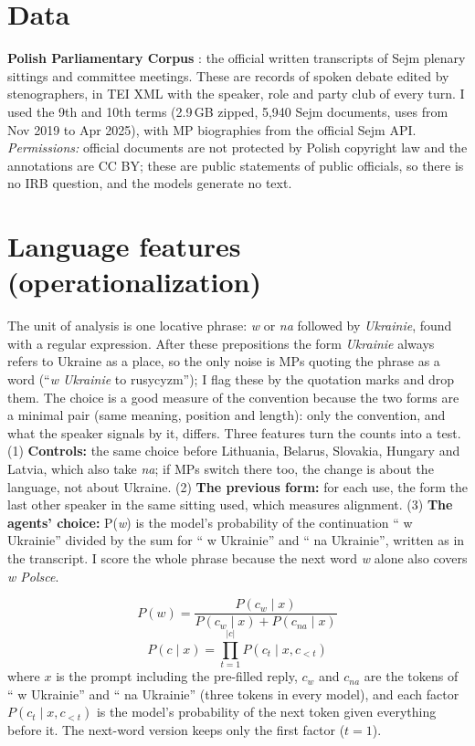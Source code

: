 \documentclass[10pt,twocolumn]{article}
\begin{document}
\section{Data}
\textbf{Polish Parliamentary Corpus} \citep[PPC;][]{ogrodniczuk2018}: the official written transcripts of Sejm plenary sittings and committee meetings. These are records of spoken debate edited by stenographers, in TEI XML with the speaker, role and party club of every turn. I used the 9th and 10th terms (2.9\,GB zipped, 5,940 Sejm documents, uses from Nov 2019 to Apr 2025), with MP biographies from the official Sejm API. \emph{Permissions:} official documents are not protected by Polish copyright law and the annotations are CC BY; these are public statements of public officials, so there is no IRB question, and the models generate no text.

\section{Language features (operationalization)}
The unit of analysis is one locative phrase: \emph{w} or \emph{na} followed by \emph{Ukrainie}, found with a regular expression. After these prepositions the form \emph{Ukrainie} always refers to Ukraine as a place, so the only noise is MPs quoting the phrase as a word (``\emph{w Ukrainie} to rusycyzm''); I flag these by the quotation marks and drop them. The choice is a good measure of the convention because the two forms are a minimal pair (same meaning, position and length): only the convention, and what the speaker signals by it, differs. Three features turn the counts into a test. (1) \textbf{Controls:} the same choice before Lithuania, Belarus, Slovakia, Hungary and Latvia, which also take \emph{na}; if MPs switch there too, the change is about the language, not about Ukraine. (2) \textbf{The previous form:} for each use, the form the last other speaker in the same sitting used, which measures alignment. (3) \textbf{The agents' choice:} P(\emph{w}) is the model's probability of the continuation `` w Ukrainie'' divided by the sum for `` w Ukrainie'' and `` na Ukrainie'', written as in the transcript. I score the whole phrase because the next word \emph{w} alone also covers \emph{w Polsce}.

\begin{equation*}
P(w) = \frac{P(c_w \mid x)}{P(c_w \mid x) + P(c_{\mathit{na}} \mid x)}
\end{equation*}
\begin{equation*}
P(c \mid x) = \prod_{t=1}^{|c|} P(c_t \mid x, c_{<t})
\end{equation*}
where $x$ is the prompt including the pre-filled reply, $c_w$ and $c_{\mathit{na}}$ are the tokens of `` w Ukrainie'' and `` na Ukrainie'' (three tokens in every model), and each factor $P(c_t \mid x, c_{<t})$ is the model's probability of the next token given everything before it. The next-word version keeps only the first factor ($t=1$).
\end{document}

